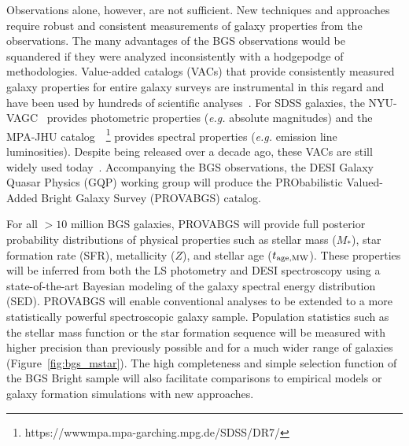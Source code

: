 Observations alone, however, are not sufficient.  
New techniques and approaches require robust and consistent measurements of
galaxy properties from the observations.
The many advantages of the BGS observations would be squandered if they were 
analyzed inconsistently with a hodgepodge of methodologies.  
Value-added catalogs (VACs) that provide consistently measured galaxy
properties for entire galaxy surveys are instrumental in this regard and have
been used by hundreds of scientific
analyses~\citep[see][for a review]{blanton2009}. 
For SDSS galaxies, the NYU-VAGC~\citep{blanton2005} provides photometric properties
(\emph{e.g.} absolute magnitudes) and the MPA-JHU
catalog~~\citep{brinchmann2004}\footnote{https://wwwmpa.mpa-garching.mpg.de/SDSS/DR7/}
provides spectral properties (\emph{e.g.} emission line
luminosities).
Despite being released over a decade ago, these VACs are still widely used
today~\citep[\emph{e.g.}][]{alpaslan2021, odonnell2021, trevisan2021}. 
Accompanying the BGS observations, the DESI Galaxy Quasar Physics (GQP) working
group will produce the PRObabilistic Valued-Added Bright Galaxy Survey
(PROVABGS) catalog. 

For all ${>}10$ million BGS galaxies, PROVABGS will provide full posterior
probability distributions of physical properties such as stellar mass ($M_*$),
star formation rate (SFR), metallicity ($Z$), and stellar age ($t_{\rm age, MW}$). 
These properties will be inferred from both the LS photometry and DESI
spectroscopy using a state-of-the-art Bayesian modeling of the galaxy spectral
energy distribution (SED). 
PROVABGS will enable conventional analyses to be extended to a more
statistically powerful spectroscopic galaxy sample. 
Population statistics such as the stellar mass function or the star formation
sequence will be measured with higher precision than previously possible and
for a much wider range of galaxies (Figure~\ref{fig:bgs_mstar}). 
The high completeness and simple selection function of the BGS Bright sample
will also facilitate  comparisons to empirical models or galaxy formation
simulations with new approaches. 

